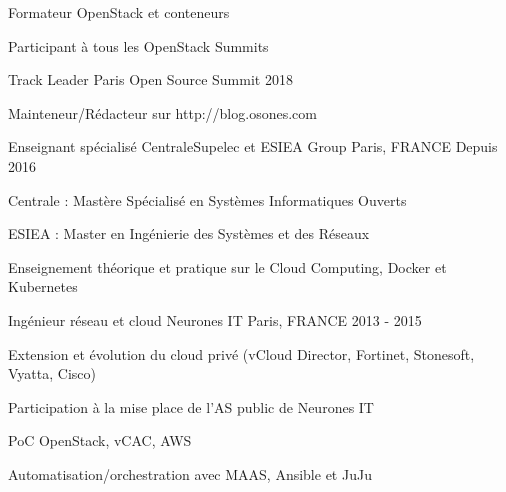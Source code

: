 \begin{cventries}
{\begin{cvitems}
        \item {Formateur OpenStack et conteneurs}
        \item {Participant à tous les OpenStack Summits}
        \item {Track Leader Paris Open Source Summit 2018}
        \item {Mainteneur/Rédacteur sur http://blog.osones.com}
      \end{cvitems}
    }

  \cventry
    {Enseignant spécialisé} %
    {CentraleSupelec et ESIEA Group}
    {Paris, FRANCE} %
    {Depuis 2016} %
    {
      \begin{cvitems} %
      \item {Centrale : Mastère Spécialisé en Systèmes Informatiques Ouverts}
      \item {ESIEA : Master en Ingénierie des Systèmes et des Réseaux}
      \item {Enseignement théorique et pratique sur le Cloud Computing, Docker et Kubernetes}
      \end{cvitems}
    }
  \cventry
    {Ingénieur réseau et cloud}
    {Neurones IT} %
    {Paris, FRANCE} %
    {2013 - 2015} %
    {
      \begin{cvitems} %
      \item {Extension et évolution du cloud privé (vCloud Director, Fortinet, Stonesoft, Vyatta, Cisco)}
      \item {Participation à la mise place de l'AS public de Neurones IT}
        \item {PoC OpenStack, vCAC, AWS}
        \item {Automatisation/orchestration avec MAAS, Ansible et JuJu}
      \end{cvitems}
    }

\end{cventries}
